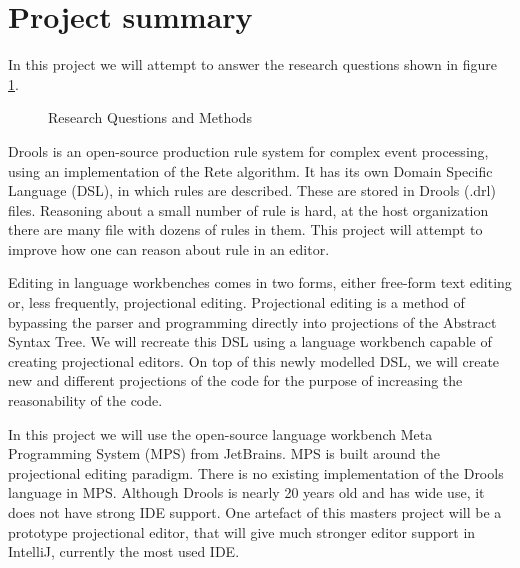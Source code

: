 \section{Project summary}

In this project we will attempt to answer the research questions shown in figure \ref{fig:Research_Questions}.
\begin{figure}[H]
    \centering
    \caption{Research Questions and Methods}
    \label{fig:Research_Questions}
\end{figure}


Drools\cite{browne2009jboss} is an open-source production rule system for complex event processing, using an implementation of the Rete algorithm\cite{forgy1989rete}.
It has its own Domain Specific Language (DSL), in which rules are described.
These are stored in Drools (.drl) files. 
Reasoning about a small number of rule is hard, at the host organization there are many file with dozens of rules in them.
This project will attempt to improve how one can reason about rule in an editor.

Editing in language workbenches comes in two forms, either free-form text editing or, less frequently, projectional editing\cite{erdweg2013state}.
Projectional editing is a method of bypassing the parser and programming directly into projections of the Abstract Syntax Tree.
We will recreate this DSL using a language workbench capable of creating projectional editors.  
On top of this newly modelled DSL, we will create new and different projections of the code for the purpose of increasing the reasonability of the code. 

In this project we will use the open-source language workbench Meta Programming System (MPS) from JetBrains\cite{MPS_ProductPage}.
MPS is built around the projectional editing paradigm.
There is no existing implementation of the Drools language in MPS.
Although Drools is nearly 20 years old and has wide use, it does not have strong IDE support.
One artefact of this masters project will be a prototype projectional editor, that will give much stronger editor support in IntelliJ, currently the most used IDE\cite{Java_usage_report}.
